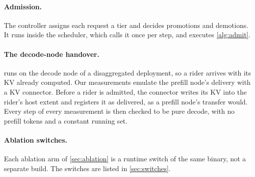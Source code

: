 \paragraph{Admission.} The controller assigns each request a tier and decides
promotions and demotions. It runs inside the scheduler, which calls it once
per step, and executes \cref{alg:admit}.

\paragraph{The decode-node handover.} \sysname{} runs on the decode node of a
disaggregated deployment, so a rider arrives with its KV already computed. Our
measurements emulate the prefill node's delivery with a KV connector. Before a
rider is admitted, the connector writes its KV into the rider's host extent
and registers it as delivered, as a prefill node's transfer would. Every step
of every measurement is then checked to be pure decode, with no prefill tokens
and a constant running set.

\paragraph{Ablation switches.} Each ablation arm of \cref{sec:ablation} is a
runtime switch of the same binary, not a separate build. The switches are
listed in \cref{sec:switches}.
